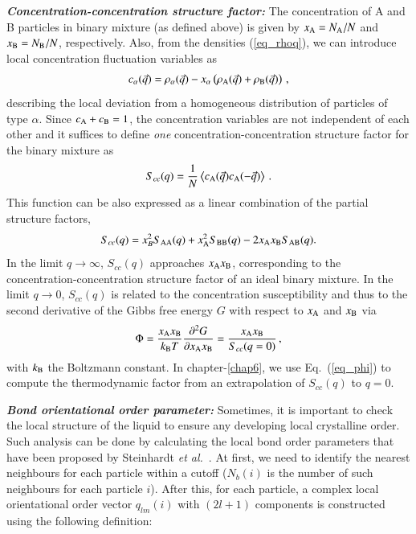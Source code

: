     {\bf \em Concentration-concentration structure factor:} The concentration of A and B particles in binary mixture (as defined above) is given by $x_{\rm A} = N_{\rm A}/N$ and $x_{\rm B} = N_{\rm B}/N$, respectively. Also, from the densities (\ref{eq_rhoq}), we can introduce local concentration fluctuation variables \cite{hansen2013,interdiff} as
    \begin{equation}
    c_\alpha (\vec{q}) = \rho_\alpha(\vec{q}) - x_\alpha \left( \rho_{\rm A}(\vec{q}) + \rho_{\rm B}(\vec{q}) \right) \, ,
    \end{equation}
    describing the local deviation from a homogeneous distribution of particles of type $\alpha$. Since {$c_{\rm A} + c_{\rm B} = 1$}, the concentration variables are not independent of each other and it suffices to define {\it one} concentration-concentration structure factor for the binary mixture as
    \begin{equation}
    S_{cc}(q) = \frac{1}{N} \left\langle c_{\rm A}(\vec{q}) c_{\rm A}(-\vec{q}) \right\rangle \, .
    \end{equation}
    This function can be also expressed as a linear combination of the partial structure factors,
    \begin{equation}
    S_{cc}(q) = x_B^2S_{\rm AA}(q)+x_{\rm A}^2 S_{\rm BB}(q) - 2x_{\rm A} x_{\rm B} S_{\rm AB}(q).   
    \end{equation}
    In the limit $q\to \infty$, $S_{cc}(q)$ approaches $x_{\rm A} x_{\rm B}$, corresponding to the concentration-concentration structure factor of an ideal binary mixture. In the limit $q\to 0$, $S_{cc}(q)$ is related to the concentration susceptibility and thus to the second derivative of the Gibbs free energy $G$ with respect to $x_{\rm A}$ and $x_{\rm B}$ via
    \begin{equation}
    \Phi = \frac{x_{\rm A} x_{\rm B}}{k_{\rm B} T} \frac{\partial^2 G}{\partial x_{\rm A} x_{\rm B}} = \frac{x_{\rm A} x_{\rm B}}{S_{cc}(q=0)} \, ,
    \label{eq_phi}
    \end{equation}
    with $k_{\rm B}$ the Boltzmann constant. In chapter-\ref{chap6}, we use Eq.~(\ref{eq_phi}) to compute the thermodynamic factor from an extrapolation of $S_{cc}(q)$ to $q=0$.
    
    {\bf \em Bond orientational order parameter:} Sometimes, it is important to check the local structure of the liquid to ensure any developing local crystalline order. Such analysis can be done by calculating the local bond order parameters that have been proposed by Steinhardt {\it et al.}~\cite{steinhardt1983}. At first, we need to identify the nearest neighbours for each particle within a cutoff ($N_b(i)$ is the number of such neighbours for each particle $i$). After this, for each particle, a complex local orientational order vector $q_{lm}(i)$ with $(2l+1)$ components is constructed using the following definition:

